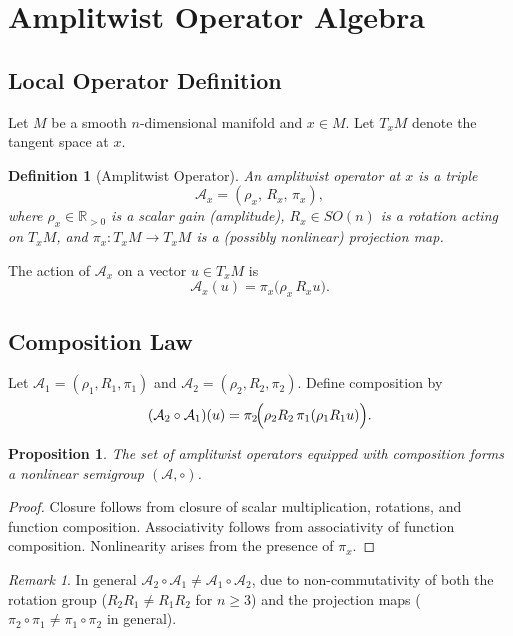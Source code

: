 \documentclass[12pt, a4paper]{article}
\newtheorem{definition}[theorem]{Definition}
\newtheorem{proposition}[theorem]{Proposition}
\theoremstyle{remark}
\newtheorem{remark}[theorem]{Remark}
\theoremstyle{definition}
\begin{document}
\section{Amplitwist Operator Algebra}
\label{app:algebra}

\subsection{Local Operator Definition}

Let $M$ be a smooth $n$-dimensional manifold and $x \in M$.  Let $T_x M$ denote the tangent
space at $x$.

\begin{definition}[Amplitwist Operator]
An \emph{amplitwist operator} at $x$ is a triple
\[
\mathcal{A}_x = (\rho_x,\, R_x,\, \pi_x),
\]
where $\rho_x \in \mathbb{R}_{>0}$ is a scalar gain (amplitude), $R_x \in SO(n)$ is a
rotation acting on $T_x M$, and $\pi_x \colon T_x M \to T_x M$ is a (possibly nonlinear)
projection map.
\end{definition}

The action of $\mathcal{A}_x$ on a vector $u \in T_x M$ is
\[
\mathcal{A}_x(u) = \pi_x\!\bigl(\rho_x\, R_x u\bigr).
\]

\subsection{Composition Law}

Let $\mathcal{A}_1 = (\rho_1, R_1, \pi_1)$ and $\mathcal{A}_2 = (\rho_2, R_2, \pi_2)$.
Define composition by
\[
(\mathcal{A}_2 \circ \mathcal{A}_1)(u)
= \pi_2\!\Bigl(\rho_2 R_2\,\pi_1(\rho_1 R_1 u)\Bigr).
\]

\begin{proposition}
The set of amplitwist operators equipped with composition forms a nonlinear semigroup
$(\mathcal{A}, \circ)$.
\end{proposition}

\begin{proof}
Closure follows from closure of scalar multiplication, rotations, and function composition.
Associativity follows from associativity of function composition.  Nonlinearity arises from
the presence of $\pi_x$.
\end{proof}

\begin{remark}
In general $\mathcal{A}_2 \circ \mathcal{A}_1 \neq \mathcal{A}_1 \circ \mathcal{A}_2$,
due to non-commutativity of both the rotation group ($R_2 R_1 \neq R_1 R_2$ for $n \ge 3$)
and the projection maps ($\pi_2 \circ \pi_1 \neq \pi_1 \circ \pi_2$ in general).
\end{remark}
\end{document}
